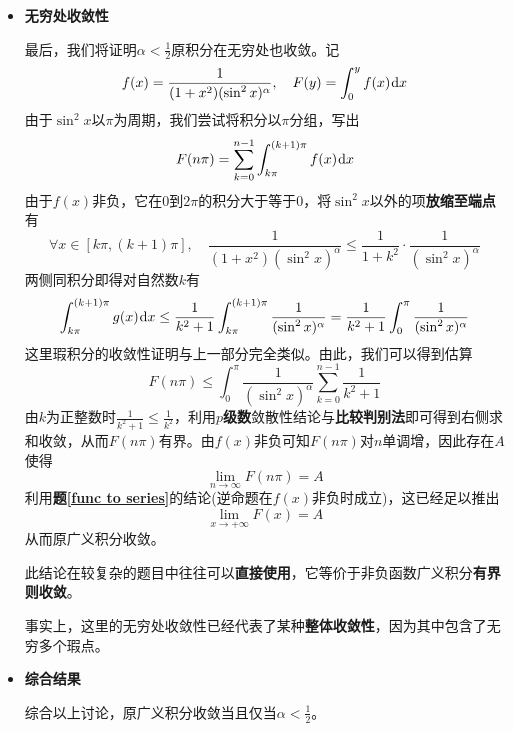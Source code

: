 \documentclass[a4paper,UTF8,fontset=windows,AutoFakeBold]{ctexart}
\newcommand*{\dr}{\hspace{0.07em}\mathrm{d}}
\newcommand*{\note}{\noindent *}
\theoremstyle{ex}
\newcommand{\exref}[1]{\textbf{题\;\ref{#1}\;}}
\begin{document}
\begin{framed}
{\begin{itemize}
        换元$t=k\pi-x$，利用\textbf{等价无穷小替换}直接计算可知
        $$\lim_{x\to(k\pi)^-}\frac{\frac{1}{(1+x^2)(\sin^2x)^\alpha}}{\frac{1}{(k\pi-x)^{2\alpha}}}=\lim_{t\to0^+}\bigg(\frac{t}{\sin t}\bigg)^{2\alpha}\cdot\frac{1}{1+(k\pi-t)^2}=\frac{1}{1+k^2\pi^2}$$
        由\textbf{幂函数瑕积分}敛散性结论可知$\int_{k\pi-\pi/2}^{k\pi}\frac{1}{(k\pi-x)^{2\alpha}}\dr x$收敛，于是根据\textbf{比较判别法}得原广义积分在$k\pi$左侧也收敛。

        对右侧，为了避免其他瑕点的影响，原广义积分的收敛性等价于
        $$\int_{k\pi}^{k\pi+\pi/2}\frac{1}{(1+x^2)(\sin^2x)^\alpha}\dr x$$
        的收敛性。

        换元$t=x-k\pi$，利用\textbf{等价无穷小替换}直接计算可知
        $$\lim_{x\to(k\pi)^+}\frac{\frac{1}{(1+x^2)(\sin^2x)^\alpha}}{\frac{1}{(k\pi+x)^{2\alpha}}}=\lim_{t\to0^+}\bigg(\frac{t}{\sin t}\bigg)^{2\alpha}\cdot\frac{1}{1+(k\pi+t)^2}=\frac{1}{1+k^2\pi^2}$$
        由\textbf{幂函数瑕积分}敛散性结论可知$\int_{k\pi}^{k\pi+\pi/2}\frac{1}{(x-k\pi)^{2\alpha}}\dr x$收敛，于是根据\textbf{比较判别法}得原广义积分在$k\pi$右侧也收敛。
        
        \item \textbf{无穷处收敛性}
        
        最后，我们将证明$\alpha<\frac{1}{2}$原积分在无穷处也收敛。记
        $$f(x)=\frac{1}{(1+x^2)(\sin^2x)^\alpha},\quad F(y)=\int_0^yf(x)\dr x$$
        由于$\sin^2x$以$\pi$为周期，我们尝试将积分以$\pi$分组，写出
        $$F(n\pi)=\sum_{k=0}^{n-1}\int_{k\pi}^{(k+1)\pi}f(x)\dr x$$
        由于$f(x)$非负，它在0到$2\pi$的积分大于等于0，将$\sin^2x$以外的项\textbf{放缩至端点}有
        $$\forall x\in[k\pi,(k+1)\pi],\quad\frac{1}{(1+x^2)(\sin^2x)^\alpha}\le\frac{1}{1+k^2}\cdot\frac{1}{(\sin^2x)^\alpha}$$
        两侧同积分即得对自然数$k$有
        $$\int_{k\pi}^{(k+1)\pi}g(x)\dr x\le\frac{1}{k^2+1}\int_{k\pi}^{(k+1)\pi}\frac{1}{(\sin^2x)^\alpha}=\frac{1}{k^2+1}\int_0^\pi\frac{1}{(\sin^2x)^\alpha}$$
        这里瑕积分的收敛性证明与上一部分完全类似。由此，我们可以得到估算
        $$F(n\pi)\le\int_0^\pi\frac{1}{(\sin^2x)^\alpha}\sum_{k=0}^{n-1}\frac{1}{k^2+1}$$
        由$k$为正整数时$\frac{1}{k^2+1}\le\frac{1}{k^2}$，利用\textbf{$p$级数}敛散性结论与\textbf{比较判别法}即可得到右侧求和收敛，从而$F(n\pi)$有界。由$f(x)$非负可知$F(n\pi)$对$n$单调增，因此存在$A$使得
        $$\lim_{n\to\infty}F(n\pi)=A$$
        利用\exref{func to series}的结论(逆命题在$f(x)$非负时成立)，这已经足以推出
        $$\lim_{x\to+\infty}F(x)=A$$
        从而原广义积分收敛。

        \note 此结论在较复杂的题目中往往可以\textbf{直接使用}，它等价于非负函数广义积分\textbf{有界则收敛}。

        \note 事实上，这里的无穷处收敛性已经代表了某种\textbf{整体收敛性}，因为其中包含了无穷多个瑕点。

        \item \textbf{综合结果}
        
        综合以上讨论，原广义积分收敛当且仅当$\alpha<\frac{1}{2}$。
    \end{itemize}
}
\end{framed}
\end{document}

